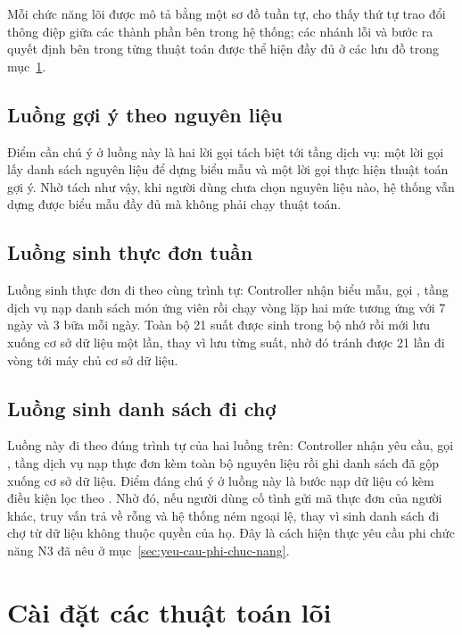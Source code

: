Mỗi chức năng lõi được mô tả bằng một sơ đồ tuần tự, cho thấy thứ tự trao đổi
thông điệp giữa các thành phần bên trong hệ thống; các nhánh lỗi và bước ra
quyết định bên trong từng thuật toán được thể hiện đầy đủ ở các lưu đồ trong
mục~\ref{sec:cai-dat-thuat-toan}.

\subsection{Luồng gợi ý theo nguyên liệu}



Điểm cần chú ý ở luồng này là hai lời gọi tách biệt tới tầng dịch vụ: một lời gọi
lấy danh sách nguyên liệu để dựng biểu mẫu và một lời gọi thực hiện thuật toán
gợi ý. Nhờ tách như vậy, khi người dùng chưa chọn nguyên liệu nào, hệ thống vẫn
dựng được biểu mẫu đầy đủ mà không phải chạy thuật toán.

\subsection{Luồng sinh thực đơn tuần}

Luồng sinh thực đơn đi theo cùng trình tự: Controller nhận biểu mẫu, gọi
, tầng dịch vụ nạp danh sách món ứng viên rồi chạy vòng
lặp hai mức tương ứng với 7 ngày và 3 bữa mỗi ngày. Toàn bộ 21 suất được sinh
trong bộ nhớ rồi mới lưu xuống cơ sở dữ liệu một lần, thay vì lưu từng suất, nhờ
đó tránh được 21 lần đi vòng tới máy chủ cơ sở dữ liệu.

\subsection{Luồng sinh danh sách đi chợ}

Luồng này đi theo đúng trình tự của hai luồng trên: Controller nhận yêu cầu, gọi
, tầng dịch vụ nạp thực đơn kèm toàn bộ nguyên liệu
rồi ghi danh sách đã gộp xuống cơ sở dữ liệu. Điểm đáng chú ý ở luồng này là bước nạp dữ liệu có kèm điều kiện lọc theo
. Nhờ đó, nếu người dùng cố tình gửi mã thực đơn của người khác,
truy vấn trả về rỗng và hệ thống ném ngoại lệ, thay vì sinh danh sách đi chợ từ
dữ liệu không thuộc quyền của họ. Đây là cách hiện thực yêu cầu phi chức năng N3
đã nêu ở mục~\ref{sec:yeu-cau-phi-chuc-nang}.

\section{Cài đặt các thuật toán lõi}
\label{sec:cai-dat-thuat-toan}

